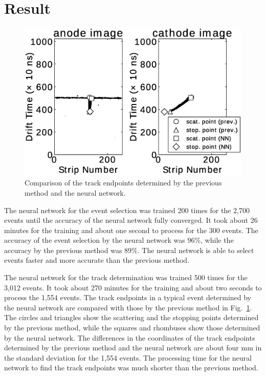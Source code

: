 \documentclass{jps-cp}
\begin{document}
\section{Result}
\begin{figure}
  \vspace{-3zw}
  \centering
  \includegraphics[clip, width=25zw]{eps/compare_mono_v4.eps}
  \caption{Comparison of the track endpoints determined by the previous method and the neural network.}
  \label{fig:result_detection}
  \vspace{-2zw}
\end{figure}

The neural network for the event selection was trained 200 times for the 2,700 events
until the accuracy of the neural network fully converged.
It took about 26 minutes for the training and about one second to process for the 300 events.
The accuracy of the event selection by the neural network was 96\%,
while the accuracy by the previous method was 89\%.
The neural network is able to select events faster and more accurate than the previous method.


The neural network for the track determination was trained 500 times for the 3,012 events.
It took about 270 minutes for the training and about two seconds to process the 1,554 events.
The track endpoints in a typical event determined by the neural network are compared with those
by the previous method in Fig.~\ref{fig:result_detection}.
The circles and triangles show the scattering and the stopping points determined by the previous method,
while the squares and rhombuses show those determined by the neural network.
The differences in the coordinates of the track endpoints determined by the previous method
and the neural network are about four mm in the standard deviation for the 1,554 events.
The processing time for the neural network to find the track endpoints was much shorter than the previous method.
\end{document}
